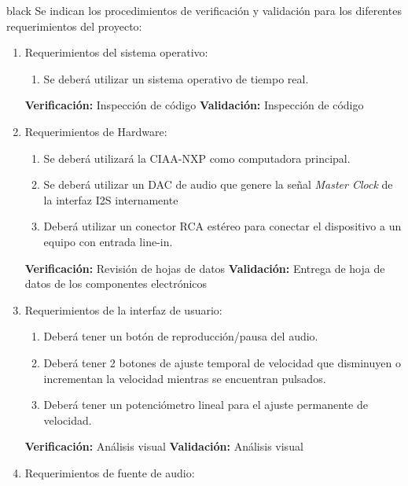 \documentclass[11pt]{charter}
\begin{document}
\begin{consigna}{black}
Se indican los procedimientos de verificación y validación para los diferentes requerimientos del proyecto:
\begin{enumerate}
\item Requerimientos del sistema operativo:

	\begin{enumerate}
	\item  Se deberá utilizar un sistema operativo de tiempo real.
	\end{enumerate}

	\textbf{Verificación:} Inspección de código \newline                                                                              
	\newline 
	\textbf{Validación:} Inspección de código
\item Requerimientos de Hardware:

	\begin{enumerate}
	\item Se deberá utilizará la CIAA-NXP como computadora principal.
	\item Se deberá utilizar un DAC de audio  que genere la señal \textit{Master Clock} de la interfaz I2S internamente 
	\item Deberá utilizar un conector RCA estéreo para conectar el dispositivo a un equipo con entrada  line-in.
	\end{enumerate}

	\textbf{Verificación:} Revisión de hojas de datos \newline                                                                              
	\newline 
	\textbf{Validación:} Entrega de hoja de datos de los componentes electrónicos
\item Requerimientos de la interfaz de usuario:

	\begin{enumerate}
	\item Deberá tener un botón de reproducción/pausa del audio.
	\item Deberá tener 2 botones de ajuste temporal de velocidad que disminuyen o incrementan la velocidad mientras se encuentran pulsados.
	\item Deberá tener un potenciómetro lineal para el ajuste permanente de velocidad.	
	\end{enumerate}

	\textbf{Verificación:} Análisis visual \newline                                                                              
	\newline 
	\textbf{Validación:} Análisis visual
\item Requerimientos de fuente de audio:


\end{enumerate}
\end{consigna}
\end{document}
